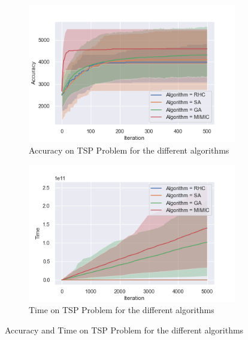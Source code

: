 \documentclass[10pt]{article}
\begin{document}
				\begin{figure}[h]
					\centering
					\begin{subfigure}[t]{0.45\columnwidth}
						\centering
						\includegraphics[width=\linewidth]{../graphics/tsp_all_Iteration_Error_Algorithm.png}
						\caption{Accuracy on TSP Problem for the different algorithms}
						\label{tsp:all_accuracy}
					\end{subfigure}
					\begin{subfigure}[t]{0.45\columnwidth}
						\centering
						\includegraphics[width=\linewidth]{../graphics/tsp_all_Iteration_Time_Algorithm.png}
						\caption{Time on TSP Problem for the different algorithms}
						\label{tsp:all_time}
					\end{subfigure}
					\caption{Accuracy and Time on TSP Problem for the different algorithms}
					\label{tsp:all}
				\end{figure}
\end{document}
